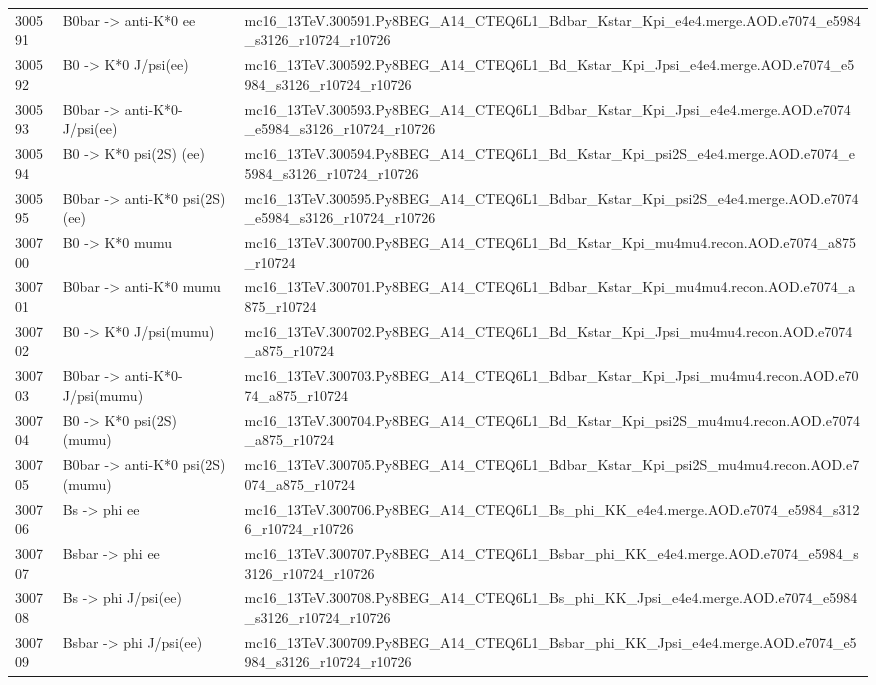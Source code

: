 \begin{table}[ht]
{\begin{tabular}{l l l}
300591 & B0bar -> anti-K*0 ee & mc16\_13TeV.300591.Py8BEG\_A14\_CTEQ6L1\_Bdbar\_Kstar\_Kpi\_e4e4.merge.AOD.e7074\_e5984\_s3126\_r10724\_r10726 \\
300592 & B0 -> K*0 J/psi(ee) & mc16\_13TeV.300592.Py8BEG\_A14\_CTEQ6L1\_Bd\_Kstar\_Kpi\_Jpsi\_e4e4.merge.AOD.e7074\_e5984\_s3126\_r10724\_r10726 \\
300593 & B0bar -> anti-K*0- J/psi(ee) & mc16\_13TeV.300593.Py8BEG\_A14\_CTEQ6L1\_Bdbar\_Kstar\_Kpi\_Jpsi\_e4e4.merge.AOD.e7074\_e5984\_s3126\_r10724\_r10726 \\
300594 & B0 -> K*0 psi(2S) (ee) & mc16\_13TeV.300594.Py8BEG\_A14\_CTEQ6L1\_Bd\_Kstar\_Kpi\_psi2S\_e4e4.merge.AOD.e7074\_e5984\_s3126\_r10724\_r10726 \\
300595 & B0bar -> anti-K*0 psi(2S) (ee) & mc16\_13TeV.300595.Py8BEG\_A14\_CTEQ6L1\_Bdbar\_Kstar\_Kpi\_psi2S\_e4e4.merge.AOD.e7074\_e5984\_s3126\_r10724\_r10726 \\
300700 & B0 -> K*0 mumu & mc16\_13TeV.300700.Py8BEG\_A14\_CTEQ6L1\_Bd\_Kstar\_Kpi\_mu4mu4.recon.AOD.e7074\_a875\_r10724 \\
300701 & B0bar -> anti-K*0 mumu & mc16\_13TeV.300701.Py8BEG\_A14\_CTEQ6L1\_Bdbar\_Kstar\_Kpi\_mu4mu4.recon.AOD.e7074\_a875\_r10724 \\
300702 & B0 -> K*0 J/psi(mumu) & mc16\_13TeV.300702.Py8BEG\_A14\_CTEQ6L1\_Bd\_Kstar\_Kpi\_Jpsi\_mu4mu4.recon.AOD.e7074\_a875\_r10724 \\
300703 & B0bar -> anti-K*0- J/psi(mumu) & mc16\_13TeV.300703.Py8BEG\_A14\_CTEQ6L1\_Bdbar\_Kstar\_Kpi\_Jpsi\_mu4mu4.recon.AOD.e7074\_a875\_r10724 \\
300704 & B0 -> K*0 psi(2S) (mumu) & mc16\_13TeV.300704.Py8BEG\_A14\_CTEQ6L1\_Bd\_Kstar\_Kpi\_psi2S\_mu4mu4.recon.AOD.e7074\_a875\_r10724 \\
300705 & B0bar -> anti-K*0 psi(2S) (mumu) & mc16\_13TeV.300705.Py8BEG\_A14\_CTEQ6L1\_Bdbar\_Kstar\_Kpi\_psi2S\_mu4mu4.recon.AOD.e7074\_a875\_r10724 \\
300706 & Bs -> phi ee & mc16\_13TeV.300706.Py8BEG\_A14\_CTEQ6L1\_Bs\_phi\_KK\_e4e4.merge.AOD.e7074\_e5984\_s3126\_r10724\_r10726 \\
300707 & Bsbar -> phi ee & mc16\_13TeV.300707.Py8BEG\_A14\_CTEQ6L1\_Bsbar\_phi\_KK\_e4e4.merge.AOD.e7074\_e5984\_s3126\_r10724\_r10726 \\
300708 & Bs -> phi J/psi(ee) & mc16\_13TeV.300708.Py8BEG\_A14\_CTEQ6L1\_Bs\_phi\_KK\_Jpsi\_e4e4.merge.AOD.e7074\_e5984\_s3126\_r10724\_r10726 \\
300709 & Bsbar -> phi J/psi(ee) & mc16\_13TeV.300709.Py8BEG\_A14\_CTEQ6L1\_Bsbar\_phi\_KK\_Jpsi\_e4e4.merge.AOD.e7074\_e5984\_s3126\_r10724\_r10726 \\

\end{tabular}}
\end{table}
